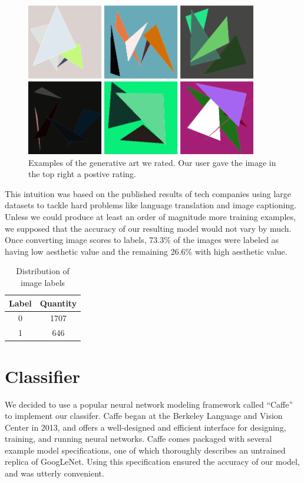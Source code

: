 \documentclass[midd]{thesis}
\begin{document}
\begin{figure}
\centering
\includegraphics[width=0.9\textwidth]{visualizations/sample-random.png}
\caption{Examples of the generative art we rated. Our user gave the image in the top right a postive rating.}
\label{fig:effectivecomplexity}
\end{figure}

This intuition was based on the published results of tech companies using large datasets to tackle hard problems like language translation and image captioning. Unless we could produce at least an order of magnitude more training examples, we supposed that the accuracy of our resulting model would not vary by much. Once converting image scores to labels, 73.3\% of the images were labeled as having low aesthetic value and the remaining 26.6\% with high aesthetic value.
\begin{table}[h]
\centering
\begin{tabular}{@{}cc@{}}
\toprule
\multicolumn{1}{l}{Label} & \multicolumn{1}{l}{Quantity} \\ \midrule
0 & 1707 \\
1 & 646 \\ \bottomrule
\end{tabular}
\caption{Distribution of image labels}
\label{score-distribution}
\end{table}

\section{Classifier}

We decided to use a popular neural network modeling framework called ``Caffe'' to implement our classifer. Caffe began at the Berkeley Language and Vision Center in 2013, and offers a well-designed and efficient interface for designing, training, and running neural networks. Caffe comes packaged with several example model specifications, one of which thoroughly describes an untrained replica of GoogLeNet. Using this specification ensured the accuracy of our model, and was utterly convenient.
\end{document}
